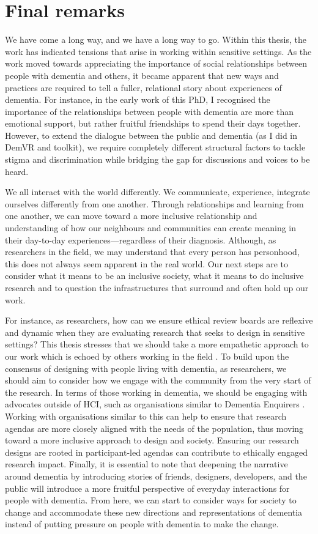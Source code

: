 \section{Final remarks}
\label{Discussion:FinalRemarks}
We have come a long way, and we have a long way to go. Within this thesis, the work has indicated tensions that arise in working within sensitive settings. As the work moved towards appreciating the importance of social relationships between people with dementia and others, it became apparent that new ways and practices are required to tell a fuller, relational story about experiences of dementia. For instance, in the early work of this PhD, I recognised the importance of the relationships between people with dementia are more than emotional support, but rather fruitful friendships to spend their days together. However, to extend the dialogue between the public and dementia (as I did in DemVR and toolkit), we require completely different structural factors to tackle stigma and discrimination while bridging the gap for discussions and voices to be heard. 

We all interact with the world differently. We communicate, experience, integrate ourselves differently from one another. Through relationships and learning from one another, we can move toward a more inclusive relationship and understanding of how our neighbours and communities can create meaning in their day-to-day experiences—regardless of their diagnosis. Although, as researchers in the field, we may understand that every person has personhood, this does not always seem apparent in the real world. Our next steps are to consider what it means to be an inclusive society, what it means to do inclusive research and to question the infrastructures that surround and often hold up our work.

 For instance, as researchers, how can we ensure ethical review boards are reflexive and dynamic when they are evaluating research that seeks to design in sensitive settings? This thesis stresses that we should take a more empathetic approach to our work which is echoed by others working in the field \citep{wallace_enabling_2012-1,lazar_safe_2019,morrissey_value_2017,kontos_integrating_2018}. To build upon the consensus of designing with people living with dementia, as researchers, we should aim to consider how we engage with the community from the very start of the research. In terms of those working in dementia, we should be engaging with advocates outside of HCI, such as organisations similar to Dementia Enquirers \citep{davies2021dementia}. Working with organisations similar to this can help to ensure that research agendas are more closely aligned with the needs of the population, thus moving toward a more inclusive approach to design and society. Ensuring our research designs are rooted in participant-led agendas can contribute to ethically engaged research impact. Finally, it is essential to note that deepening the narrative around dementia by introducing stories of friends, designers, developers, and the public will introduce a more fruitful perspective of everyday interactions for people with dementia. From here, we can start to consider ways for society to change and accommodate these new directions and representations of dementia instead of putting pressure on people with dementia to make the change.
